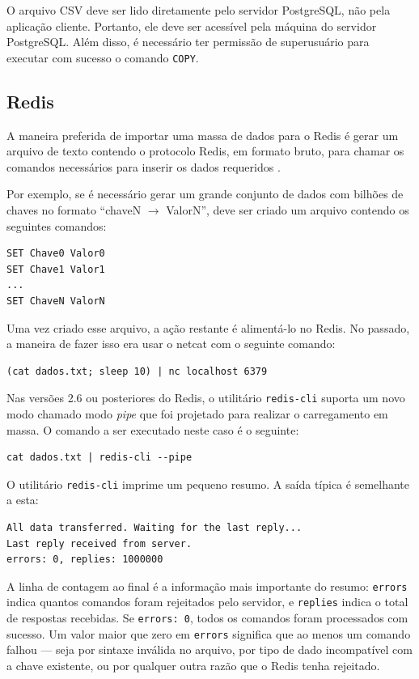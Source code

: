 O arquivo CSV deve ser lido diretamente pelo servidor PostgreSQL, não pela aplicação
cliente. Portanto, ele deve ser acessível pela máquina do servidor PostgreSQL. Além disso,
é necessário ter permissão de superusuário para executar com sucesso o comando
\texttt{COPY}.

\subsection{Redis}

A maneira preferida de importar uma massa de dados para o Redis é gerar um arquivo de
texto contendo o protocolo Redis, em formato bruto, para chamar os comandos necessários
para inserir os dados requeridos \cite{redis_bulkloading}.

Por exemplo, se é necessário gerar um grande conjunto de dados com bilhões de chaves no
formato ``chaveN $\rightarrow$ ValorN'', deve ser criado um arquivo contendo os seguintes
comandos:

\begin{lstlisting}[style=textstyle]
SET Chave0 Valor0
SET Chave1 Valor1
...
SET ChaveN ValorN
\end{lstlisting}

Uma vez criado esse arquivo, a ação restante é alimentá-lo no Redis. No passado, a maneira
de fazer isso era usar o netcat com o seguinte comando:

\begin{lstlisting}[style=bashstyle]
(cat dados.txt; sleep 10) | nc localhost 6379
\end{lstlisting}

Nas versões 2.6 ou posteriores do Redis, o utilitário \texttt{redis-cli} suporta um novo
modo chamado modo \textit{pipe} que foi projetado para realizar o carregamento em massa. O
comando a ser executado neste caso é o seguinte:

\begin{lstlisting}[style=bashstyle]
cat dados.txt | redis-cli --pipe
\end{lstlisting}

O utilitário \texttt{redis-cli} imprime um pequeno resumo. A saída típica é semelhante a
esta:

\begin{lstlisting}[style=textstyle]
All data transferred. Waiting for the last reply...
Last reply received from server.
errors: 0, replies: 1000000
\end{lstlisting}

A linha de contagem ao final é a informação mais importante do resumo: \texttt{errors}
indica quantos comandos foram rejeitados pelo servidor, e \texttt{replies} indica o total
de respostas recebidas. Se \texttt{errors: 0}, todos os comandos foram processados com
sucesso. Um valor maior que zero em \texttt{errors} significa que ao menos um comando
falhou --- seja por sintaxe inválida no arquivo, por tipo de dado incompatível com a chave
existente, ou por qualquer outra razão que o Redis tenha rejeitado.

